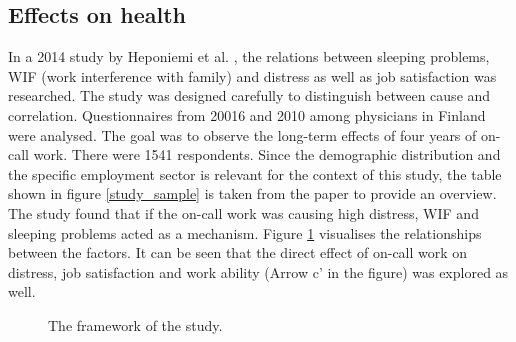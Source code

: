 \documentclass{CML_Seminar_Template}
\begin{document}
\subsection{Effects on health}
In a 2014 study by Heponiemi et al. \cite[]{heponiemi2014call}, the relations between sleeping problems, WIF (work interference with family) and distress as well as job satisfaction was researched. The study was designed carefully to distinguish between cause and correlation. Questionnaires from 20016 and 2010 among physicians in Finland were analysed. The goal was to observe the long-term effects of four years of on-call work. There were 1541 respondents. Since the demographic distribution and the specific employment sector is relevant for the context of this study, the table shown in figure \ref{study_sample} is taken from the paper to provide an overview. The study found that if the on-call work was causing high distress, WIF and sleeping problems acted as a mechanism. Figure \ref{wif_sleeping_problems} visualises the relationships between the factors. It can be seen that the direct effect of on-call work on distress, job satisfaction and work ability (Arrow c' in the figure) was explored as well.

\begin{figure}[htb]
  \begin{center}
  \end{center}
    \caption{\label{wif_sleeping_problems}  The framework of the study. \cite[]{heponiemi2014call}}
\end{figure}
\end{document}
